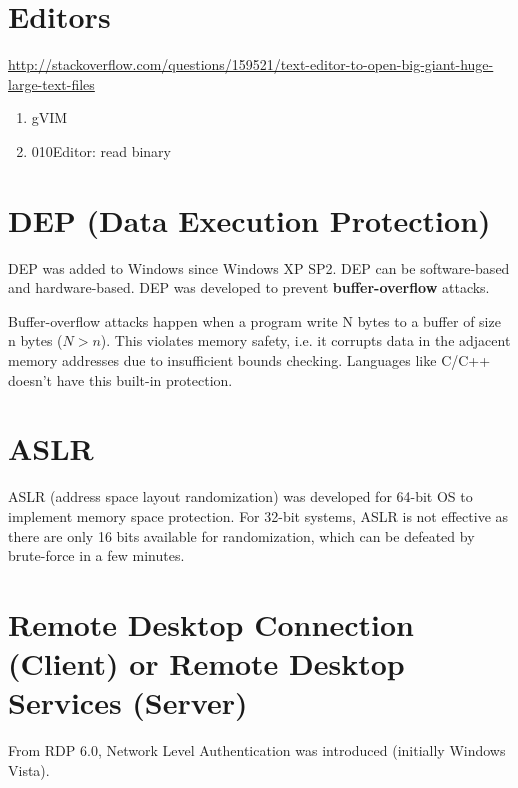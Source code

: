 

\section{Editors}

\url{http://stackoverflow.com/questions/159521/text-editor-to-open-big-giant-huge-large-text-files}

\begin{enumerate}
  \item gVIM
  \item 010Editor: read binary
\end{enumerate}

\section[DEP]{DEP (Data Execution Protection)}
\label{sec:DEP}


DEP was added to Windows since Windows XP SP2. DEP can be software-based and
hardware-based. DEP was developed to prevent {\bf buffer-overflow} attacks.	

\begin{framed}
Buffer-overflow attacks happen when a program write N bytes to a buffer of size
n bytes ($N>n$). This violates memory safety, i.e. it corrupts data in the
adjacent memory addresses due to insufficient bounds checking. Languages like
C/C++ doesn't have this built-in protection. 
\end{framed}


\section{ASLR}
\label{sec:ASLR}

ASLR (address space layout randomization) was developed for 64-bit OS to
implement memory space protection. For 32-bit systems, ASLR is not effective as
there are only 16 bits available for randomization, which can be defeated by
brute-force in a few minutes.


\section{Remote Desktop Connection (Client) or Remote Desktop Services (Server)}
\label{sec:remote-dekstop-connection}

From RDP 6.0, Network Level Authentication was introduced (initially Windows
Vista). 


